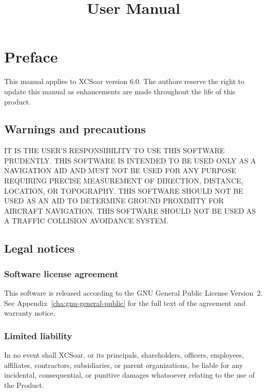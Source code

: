 \documentclass[a4paper,12pt]{refrep}
\title{User Manual}
\begin{document}
\maketitle

\begingroup
\setlength{\parskip}{0.1\baselineskip}
\tableofcontents
\endgroup


\chapter*{Preface}

This manual applies to XCSoar version 6.0.  The authors reserve the
right to update this manual as enhancements are made throughout the
life of this product.

\section*{Warnings and precautions}

\warning IT IS THE USER'S RESPONSIBILITY TO USE THIS SOFTWARE PRUDENTLY. THIS
SOFTWARE IS INTENDED TO BE USED ONLY AS A NAVIGATION AID AND MUST NOT
BE USED FOR ANY PURPOSE REQUIRING PRECISE MEASUREMENT OF DIRECTION,
DISTANCE, LOCATION, OR TOPOGRAPHY. THIS SOFTWARE SHOULD NOT BE USED AS
AN AID TO DETERMINE GROUND PROXIMITY FOR AIRCRAFT NAVIGATION.
THIS SOFTWARE SHOULD NOT BE USED AS A TRAFFIC COLLISION AVOIDANCE SYSTEM.


\section*{Legal notices}

\subsection*{Software license agreement}

This software is released according to the GNU General Public License
Version~2.  See Appendix~\ref{cha:gnu-general-public} for the full
text of the agreement and warranty notice.

\subsection*{Limited liability}

In no event shall XCSoar, or its principals, shareholders, officers,
employees, affiliates, contractors, subsidiaries, or parent
organizations, be liable for any incidental, consequential, or
punitive damages whatsoever relating to the use of the Product.
\end{document}
